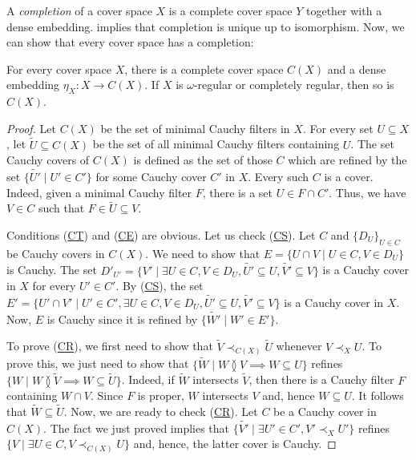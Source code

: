 \documentclass[reqno]{amsart}
\newcommand{\axref}[1]{(\hyperref[ax:#1]{#1})}
\theoremstyle{definition}
\theoremstyle{remark}
\numberwithin{figure}{section}
\newcommand{\overlap}[2]{#1 \between #2}
\newcommand{\rb}{\prec}
\begin{document}
A \emph{completion} of a cover space $X$ is a complete cover space $Y$ together with a dense embedding.
 implies that completion is unique up to isomorphism.
Now, we can show that every cover space has a completion:

\begin{thm}[completion]
For every cover space $X$, there is a complete cover space $C(X)$ and a dense embedding $\eta_X : X \to C(X)$.
If $X$ is $\omega$-regular or completely regular, then so is $C(X)$.
\end{thm}
\begin{proof}
Let $C(X)$ be the set of minimal Cauchy filters in $X$.
For every set $U \subseteq X$, let $\widetilde{U} \subseteq C(X)$ be the set of all minimal Cauchy filters containing $U$.
The set Cauchy covers of $C(X)$ is defined as the set of those $C$ which are refined by the set $\{ \widetilde{U'} \mid U' \in C' \}$ for some Cauchy cover $C'$ in $X$.
Every such $C$ is a cover.
Indeed, given a minimal Cauchy filter $F$, there is a set $U \in F \cap C'$.
Thus, we have $V \in C$ such that $F \in \widetilde{U} \subseteq V$.

Conditions \axref{CT} and \axref{CE} are obvious.
Let us check \axref{CS}.
Let $C$ and $\{ D_U \}_{U \in C}$ be Cauchy covers in $C(X)$.
We need to show that $E = \{ U \cap V \mid U \in C, V \in D_U \}$ is Cauchy.
The set $D'_{U'} = \{ V' \mid \exists U \in C, V \in D_U, \widetilde{U'} \subseteq U, \widetilde{V'} \subseteq V \}$ is a Cauchy cover in $X$ for every $U' \in C'$.
By \axref{CS}, the set $E' = \{ U' \cap V' \mid U' \in C', \exists U \in C, V \in D_U, \widetilde{U'} \subseteq U, \widetilde{V'} \subseteq V \}$ is a Cauchy cover in $X$.
Now, $E$ is Cauchy since it is refined by $\{ \widetilde{W'} \mid W' \in E' \}$.

To prove \axref{CR}, we first need to show that $\widetilde{V} \rb_{C(X)} \widetilde{U}$ whenever $V \rb_X U$.
To prove this, we just need to show that $\{ \widetilde{W} \mid \overlap{W}{V} \implies W \subseteq U \}$ refines $\{ W \mid \overlap{W}{\widetilde{V}} \implies W \subseteq \widetilde{U} \}$.
Indeed, if $\widetilde{W}$ intersects $\widetilde{V}$, then there is a Cauchy filter $F$ containing $W \cap V$.
Since $F$ is proper, $W$ intersects $V$ and, hence $W \subseteq U$.
It follows that $\widetilde{W} \subseteq \widetilde{U}$.
Now, we are ready to check \axref{CR}.
Let $C$ be a Cauchy cover in $C(X)$.
The fact we just proved implies that $\{ \widetilde{V'} \mid \exists U' \in C', V' \rb_X U' \}$ refines $\{ V \mid \exists U \in C, V \rb_{C(X)} U \}$ and, hence, the latter cover is Cauchy.


\end{proof}
\end{document}
